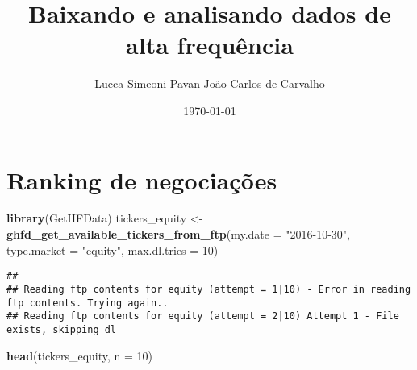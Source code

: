 \documentclass[]{article}
\title{Baixando e analisando dados de alta frequência}
\author{Lucca Simeoni Pavan \hspace{1cm} João Carlos de Carvalho}
\date{\today}
\newenvironment{Shaded}{\begin{snugshade}}{\end{snugshade}}
\newcommand{\KeywordTok}[1]{\textcolor[rgb]{0.13,0.29,0.53}{\textbf{{#1}}}}
\newcommand{\DataTypeTok}[1]{\textcolor[rgb]{0.13,0.29,0.53}{{#1}}}
\newcommand{\DecValTok}[1]{\textcolor[rgb]{0.00,0.00,0.81}{{#1}}}
\newcommand{\StringTok}[1]{\textcolor[rgb]{0.31,0.60,0.02}{{#1}}}
\newcommand{\OtherTok}[1]{\textcolor[rgb]{0.56,0.35,0.01}{{#1}}}
\newcommand{\NormalTok}[1]{{#1}}
\begin{document}
\maketitle

{
\setcounter{tocdepth}{2}
\tableofcontents
}
\begin{Shaded}
\end{Shaded}

\section{Ranking de negociações}\label{ranking-de-negociacoes}

\begin{Shaded}
\begin{Highlighting}[]
\KeywordTok{library}\NormalTok{(GetHFData)}
\NormalTok{tickers_equity <-}\StringTok{ }\KeywordTok{ghfd_get_available_tickers_from_ftp}\NormalTok{(}\DataTypeTok{my.date =} \StringTok{"2016-10-30"}\NormalTok{, }
    \DataTypeTok{type.market =} \StringTok{"equity"}\NormalTok{, }\DataTypeTok{max.dl.tries =} \DecValTok{10}\NormalTok{)}
\end{Highlighting}
\end{Shaded}

\begin{verbatim}
## 
## Reading ftp contents for equity (attempt = 1|10) - Error in reading ftp contents. Trying again..
## Reading ftp contents for equity (attempt = 2|10) Attempt 1 - File exists, skipping dl
\end{verbatim}

\begin{Shaded}
\begin{Highlighting}[]
\KeywordTok{head}\NormalTok{(tickers_equity, }\DataTypeTok{n =} \DecValTok{10}\NormalTok{)}
\end{Highlighting}
\end{Shaded}
\end{document}
